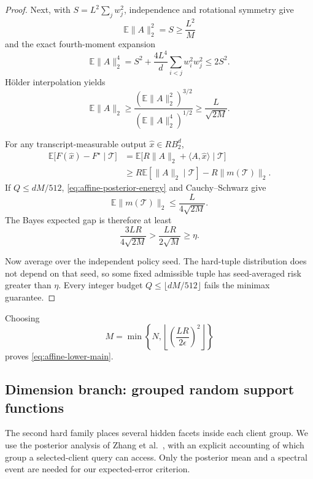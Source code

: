 \documentclass[11pt]{article}
\numberwithin{equation}{section}
\theoremstyle{remark}
\theoremstyle{definition}
\newcommand{\E}{\mathbb{E}}
\newcommand{\cT}{\mathcal{T}}
\newcommand{\Ball}{B_2}
\newcommand{\ip}[2]{\langle #1,#2\rangle}
\newcommand{\norm}[1]{\lVert #1\rVert_2}
\newcommand{\eps}{\epsilon}
\begin{document}
\begin{proof}
Next, with $S=L^2\sum_jw_j^2$, independence and rotational symmetry give
\[
\E\norm A^2=S\ge\frac{L^2}{M}
\]
and the exact fourth-moment expansion
\[
\E\norm A^4
=S^2+\frac{4L^4}{d}\sum_{i<j}w_i^2w_j^2
\le2S^2.
\]
H\"older interpolation yields
\[
\E\norm A
\ge
\frac{(\E\norm A^2)^{3/2}}{(\E\norm A^4)^{1/2}}
\ge\frac{L}{\sqrt{2M}}.
\]

For any transcript-measurable output $\widehat x\in R\Ball^d$,
\begin{align*}
\E\bigl[F(\widehat x)-F^\star\mid\cT\bigr]
&=\E\bigl[R\norm A+\ip A{\widehat x}\mid\cT\bigr]\\
&\ge R\E[\norm A\mid\cT]-R\norm{m(\cT)}.
\end{align*}
If $Q\le dM/512$, \eqref{eq:affine-posterior-energy} and Cauchy--Schwarz give
\[
\E\norm{m(\cT)}\le\frac{L}{4\sqrt{2M}}.
\]
The Bayes expected gap is therefore at least
\[
\frac{3LR}{4\sqrt{2M}}>\frac{LR}{2\sqrt M}\ge\eta.
\]

Now average over the independent policy seed.  The hard-tuple distribution does not depend on that seed, so some fixed admissible tuple has seed-averaged risk greater than $\eta$.  Every integer budget $Q\le\lfloor dM/512\rfloor$ fails the minimax guarantee.
\end{proof}

Choosing
\[
M=\min\left\{N,
\left\lfloor\left(\frac{LR}{2\eps}\right)^2\right\rfloor
\right\}
\]
proves \eqref{eq:affine-lower-main}.

\subsection{Dimension branch: grouped random support functions}

The second hard family places several hidden facets inside each client
group. We use the posterior analysis of Zhang et al.~\cite{zzql2026},
with an explicit accounting of which group a selected-client query can
access. Only the posterior mean and a spectral event are needed for our
expected-error criterion.
\end{document}

